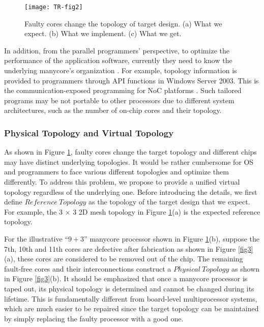 \begin{figure}[t]
    \centering
        \texttt{[image: TR-fig2]}
          \caption{ Faulty cores change the topology of target design. (a) What we expect.
          (b) What we implement. (c) What we get.}
             \label{fig2}
\end{figure}

In addition, from the parallel programmers’ perspective, to optimize the performance of the application software, currently they need to know the underlying manycore’s organization \cite{patterson2016computer}. For example, topology information is provided to programmers through API functions in Windows Server 2003. This is the communication-exposed programming for NoC platforms \cite{de2008networks}. Such tailored programs may be not portable to other processors due to different system architectures, such as the number of on-chip cores and their topology.

\subsubsection{Physical Topology and Virtual Topology}
As shown in Figure \ref{fig2}, faulty cores change the target topology and different chips may have distinct underlying topologies. It would be rather cumbersome for OS and programmers to face various different topologies and optimize them differently. To address this problem, we propose to provide a unified virtual topology regardless of the underlying one. Before introducing the details, we first define $Reference\ Topology$ as the topology of the target design that we expect. For example, the 3 $\times$ 3 2D mesh topology in Figure \ref{fig2}(a) is the expected reference topology.

For the illustrative “$9+3$” manycore processor shown in Figure \ref{fig2}(b), suppose the 7th, 10th and 11th cores are defective after fabrication as shown in Figure \ref{fig3}(a), these cores are considered to be removed out of the chip. The remaining fault-free cores and their interconnections construct a $Physical\ Topology$ as shown in Figure \ref{fig3}(b). It should be emphasized that once a manycore processor is taped out, its physical topology is determined and cannot be changed during its lifetime. This is fundamentally different from board-level multiprocessor systems, which are much easier to be repaired since the target topology can be maintained by simply replacing the faulty processor with a good one.

